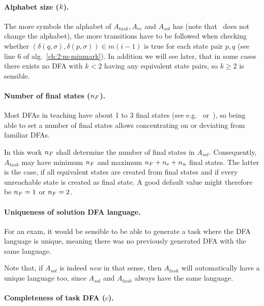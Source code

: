 \paragraph*{Alphabet size \texorpdfstring{($k$)}{}.}

The more symbols the alphabet of $A_{task}, A_{re}$ and $A_{sol}$ has (note that \MinAlg\ does not change the alphabet), the more transitions have to be followed when checking whether $(\delta(q,\sigma),\delta(p,\sigma))\in m(i-1)$ is true for each state pair $p,q$ (see line 6 of alg.~\ref{ch:2:m-minmark}). In addition we will see later, that in some cases there exists no DFA with $k<2$ having any equivalent state pairs, so $k\ge 2$ is sensible.

\paragraph*{Number of final states \texorpdfstring{(${n_F}$)}{}.}

Most DFAs in teaching have about 1 to 3 final states (see e.g.~\cite[pp. 48-78]{HMU01} or~\cite[pp. 28-48]{Sch01}), so being able to set a number of final states allows concentrating on or deviating from familiar DFAs.

In this work ${n_F}$ shall determine the number of final states in $A_{sol}$. Consequently, $A_{task}$ may have minimum ${n_F}$ and maximum ${n_F} + {n_e} + {n_u}$ final states. The latter is the case, if all equivalent states are created from final states and if every unreachable state is created as final state. A good default value might therefore be ${n_F} = 1$ or ${n_F} = 2$.

\paragraph*{Uniqueness of solution DFA language.}

For an exam, it would be sensible to be able to generate a task where the DFA language is unique, meaning there was no previously generated DFA with the same language.

Note that, if $A_{sol}$ is indeed \emph{new} in that sense, then $A_{task}$ will automatically have a unique language too, since $A_{sol}$ and $A_{task}$ always have the same language.

\paragraph*{Completeness of task DFA \texorpdfstring{($c$)}{}.}

